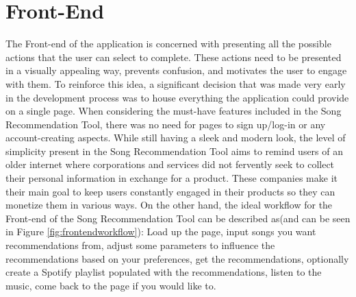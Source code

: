 \documentclass{l4proj}
\begin{document}
\section{Front-End}
The Front-end of the application is concerned with presenting all the possible actions that the user can select to complete. These actions need to be presented in a visually appealing way, prevents confusion, and motivates the user to engage with them. To reinforce this idea, a significant decision that was made very early in the development process was to house everything the application could provide on a single page. When considering the must-have features included in the Song Recommendation Tool, there was no need for pages to sign up/log-in or any account-creating aspects. While still having a sleek and modern look, the level of simplicity present in the Song Recommendation Tool aims to remind users of an older internet where corporations and services did not fervently seek to collect their personal information in exchange for a product. These companies make it their main goal to keep users constantly engaged in their products so they can monetize them in various ways. On the other hand, the ideal workflow for the Front-end of the Song Recommendation Tool can be described as(and can be seen in Figure \ref{fig:frontendworkflow}): Load up the page, input songs you want recommendations from, adjust some parameters to influence the recommendations based on your preferences, get the recommendations, optionally create a Spotify playlist populated with the recommendations, listen to the music, come back to the page if you would like to.
\end{document}
